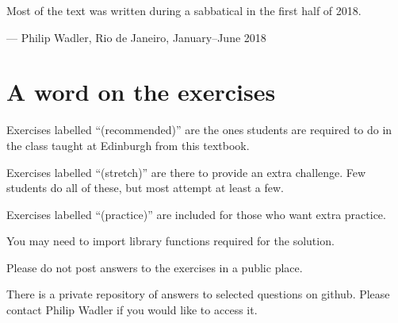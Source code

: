Most of the text was written during a sabbatical in the first half of
2018.

--- Philip Wadler, Rio de Janeiro, January--June 2018

\hypertarget{a-word-on-the-exercises}{%
\section{A word on the exercises}\label{a-word-on-the-exercises}}

Exercises labelled ``(recommended)'' are the ones students are required
to do in the class taught at Edinburgh from this textbook.

Exercises labelled ``(stretch)'' are there to provide an extra
challenge. Few students do all of these, but most attempt at least a
few.

Exercises labelled ``(practice)'' are included for those who want extra
practice.

You may need to import library functions required for the solution.

Please do not post answers to the exercises in a public place.

There is a private repository of answers to selected questions on
github. Please contact Philip Wadler if you would like to access it.

